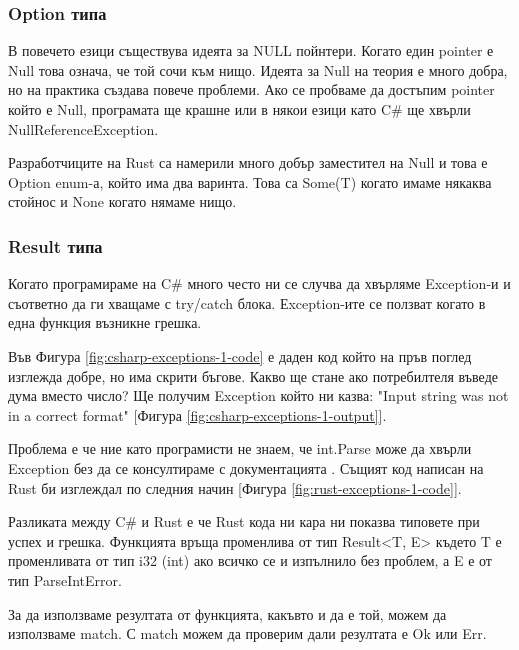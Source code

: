 \subsubsection{Option типа}
В повечето езици съществува идеята за NULL пойнтери. Когато един pointer е Null
това означа, че той сочи към нищо. Идеята за Null на теория е много добра, но
на практика създава повече проблеми. Ако се пробваме да достъпим pointer който
е Null, програмата ще крашне или в някои езици като C\# ще хвърли
NullReferenceException.

Разработчиците на Rust са намерили много добър заместител на Null и това е
Option enum-а, който има два варинта. Това са Some(T) когато имаме някаква
стойнос и None когато нямаме нищо.

\subsubsection{Result типа}
Когато програмираме на C\# много често ни се случва да хвърляме Exception-и и
съответно да ги хващаме с try/catch блока. Еxception-ите се ползват когато в
една функция възникне грешка.

Във Фигура \ref{fig:csharp-exceptions-1-code} е даден код който на пръв поглед
изглежда добре, но има скрити бъгове. Какво ще стане ако потребилтеля въведе
дума вместо число? Ще получим Exception който ни казва: "Input string was not
in a correct format" [Фигура \ref{fig:csharp-exceptions-1-output}].

Проблема е че ние като програмисти не знаем, че int.Parse може да хвърли
Exception без да се консултираме с документацията \cite{CSharp_Int_Parse}.
Същият код написан на Rust би изглеждал по следния начин [Фигура \ref{fig:rust-exceptions-1-code}].

Разликата между C\# и Rust е че Rust кода ни кара ни показва типовете при успех
и грешка. Функцията връща променлива от тип Result<T, E> където T е
променливата от тип i32 (int) ако всичко се и изпълнило без проблем, а E е от
тип ParseIntError.

За да използваме резултата от функцията, какъвто и да е той, можем да
използваме match. С match можем да проверим дали резултата е Ok или Err.

%
%

